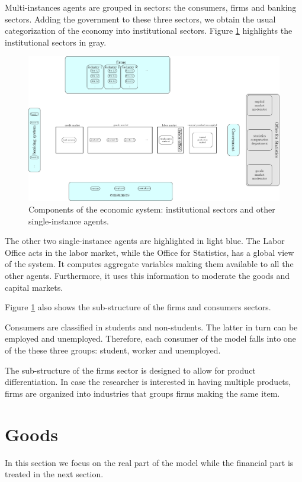 \documentclass{book}
\begin{document}
Multi-instances agents are grouped in sectors: the consumers, firms and banking sectors. Adding the government to these three sectors, we obtain the usual categorization of the economy into institutional sectors. Figure \ref{fig:componentsc1} highlights the institutional sectors in gray.
\begin{figure}[htp]
\hskip-1cm\includegraphics[scale=0.5]{agents_and_interactions_figure1c1-0.pdf}
	\caption{Components of the economic system: institutional sectors and other single-instance agents.}
	\label{fig:componentsc1}
\end{figure}
The other two single-instance agents are highlighted in light blue. The Labor Office acts in the labor market, while the Office for Statistics, has a global view of the system. It computes aggregate variables making them available to all the other agents. Furthermore, it uses this information to moderate the goods and capital markets.

Figure \ref{fig:componentsc1} also shows the sub-structure of the firms and consumers sectors. 

Consumers are classified in students and non-students. The latter in turn can be employed and unemployed. Therefore, each consumer of the model falls into one of the these three groups: student, worker and unemployed.

The sub-structure of the firms sector is designed to allow for product differentiation. In case the researcher is interested in having multiple products, firms are organized into industries that groups firms making the same item.


\clearpage
\section{Goods}
In this section we focus on the real part of the model while the financial part is treated in the next section.
\end{document}
